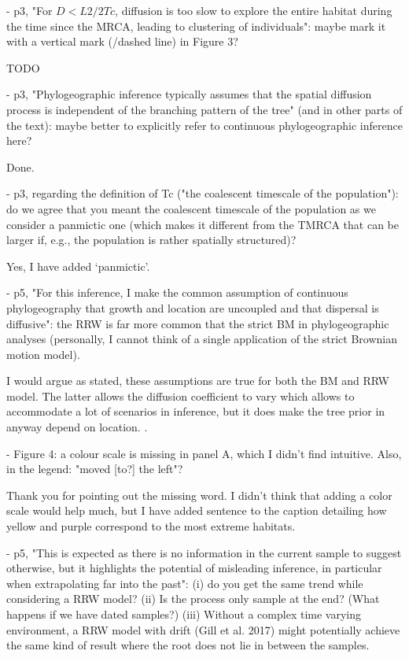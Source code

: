 \documentclass[11pt, oneside]{article}   	%
\newcommand{\response}[1]{{\color{black}{\bf Response:} #1}}
\begin{document}
- p3, "For $D < L2/2Tc$, diffusion is too slow to explore the entire habitat during the time since the MRCA, leading to clustering of individuals": maybe mark it with a vertical mark (/dashed line) in Figure 3?

\response{TODO}

- p3, "Phylogeographic inference typically assumes that the spatial diffusion process is independent of the branching pattern of the tree" (and in other parts of the text): maybe better to explicitly refer to continuous phylogeographic inference here?

\response{Done.}

- p3, regarding the definition of Tc ("the coalescent timescale of the population"): do we agree that you meant the coalescent timescale of the population as we consider a panmictic one (which makes it different from the TMRCA that can be larger if, e.g., the population is rather spatially structured)?

\response{Yes, I have added `panmictic'.}

- p5, "For this inference, I make the common assumption of continuous phylogeography that growth and location are uncoupled and that dispersal is diffusive": the RRW is far more common that the strict BM in phylogeographic analyses (personally, I cannot think of a single application of the strict Brownian motion model).

\response{I would argue as stated, these assumptions are true for both the BM and RRW model. The latter allows the diffusion coefficient to vary which allows to accommodate a lot of scenarios in inference, but it does make the tree prior in anyway depend on location. }.


- Figure 4: a colour scale is missing in panel A, which I didn't find intuitive. Also, in the legend: "moved [to?] the left"?

\response{Thank you for pointing out the missing word. I didn't think that adding a color scale would help much, but I have added sentence to the caption detailing how yellow and purple correspond to the most extreme habitats.}


- p5, "This is expected as there is no information in the current sample to suggest otherwise, but it highlights the potential of misleading inference, in particular when extrapolating far into the past": (i) do you get the same trend while considering a RRW model? (ii) Is the process only sample at the end? (What happens if we have dated samples?) (iii) Without a complex time varying environment, a RRW model with drift (Gill et al. 2017) might potentially achieve the same kind of result where the root does not lie in between the samples.
\end{document}
